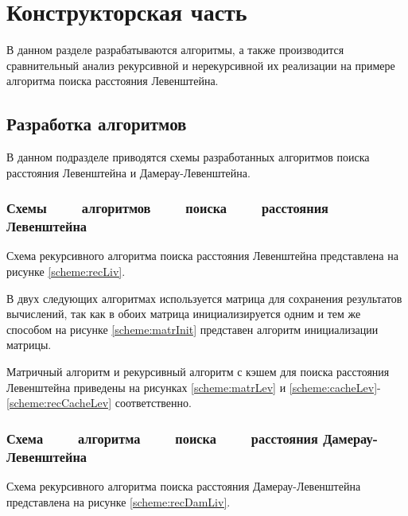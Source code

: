 \chapter{Конструкторская часть}

В данном разделе разрабатываются алгоритмы, а также производится сравнительный
анализ рекурсивной и нерекурсивной их реализации на примере алгоритма поиска
расстояния Левенштейна.

\section{Разработка алгоритмов}

В данном подразделе приводятся схемы разработанных алгоритмов поиска расстояния
Левенштейна и Дамерау-Левенштейна.

\subsection[Схемы алгоритмов поиска расстояния Левенштейна]
           {Схемы ~~~~алгоритмов ~~~~поиска ~~~~расстояния Левенштейна}

Схема рекурсивного алгоритма поиска расстояния Левенштейна представлена
на рисунке \ref{scheme:recLiv}.
\noindent
{}

В двух следующих алгоритмах используется матрица для сохранения результатов
вычислений, так как в обоих матрица инициализируется одним и тем же способом
на рисунке \ref{scheme:matrInit} представен алгоритм инициализации матрицы.
\noindent
{}

Матричный алгоритм и рекурсивный алгоритм с кэшем для поиска расстояния
Левенштейна приведены на рисунках \ref{scheme:matrLev} и
\ref{scheme:cacheLev}-\ref{scheme:recCacheLev} соответственно.

\noindent
{}
\noindent
{}
\noindent
{}

\subsection[Схема алгоритма поиска расстояния Дамерау-Левенштейна]
           {Схема ~~~~алгоритма ~~~~поиска ~~~~расстояния Дамерау-Левенштейна}

Схема рекурсивного алгоритма поиска расстояния Дамерау-Левенштейна представлена
на рисунке \ref{scheme:recDamLiv}.
\noindent
{}
